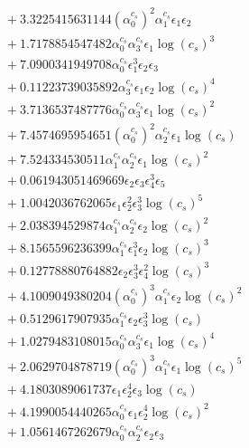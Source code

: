 \documentclass[10pt]{article}
\begin{document}
\begin{align*}
&{}  + 3.3225415631144 \left(\alpha_{0}^{c_s}\right)^{2} \alpha_{1}^{c_s} \epsilon_{1} \epsilon_{2} \\
&{}  + 1.7178854547482 \alpha_{0}^{c_s} \alpha_{3}^{c_s} \epsilon_{1} \log{\left(c_{s} \right)}^{3} \\
&{}  + 7.0900341949708 \alpha_{0}^{c_s} \epsilon_{1}^{3} \epsilon_{2} \epsilon_{3} \\
&{}  + 0.11223739035892 \alpha_{3}^{c_s} \epsilon_{1} \epsilon_{2} \log{\left(c_{s} \right)}^{4} \\
&{}  + 3.7136537487776 \alpha_{0}^{c_s} \alpha_{3}^{c_s} \epsilon_{1} \log{\left(c_{s} \right)}^{2} \\
&{}  + 7.4574695954651 \left(\alpha_{0}^{c_s}\right)^{2} \alpha_{2}^{c_s} \epsilon_{1} \log{\left(c_{s} \right)} \\
&{}  + 7.524334530511 \alpha_{1}^{c_s} \alpha_{2}^{c_s} \epsilon_{1} \log{\left(c_{s} \right)}^{2} \\
&{}  + 0.061943051469669 \epsilon_{2} \epsilon_{3} \epsilon_{4}^{3} \epsilon_{5} \\
&{}  + 1.0042036762065 \epsilon_{1} \epsilon_{2}^{2} \epsilon_{3}^{3} \log{\left(c_{s} \right)}^{5} \\
&{}  + 2.038394529874 \alpha_{1}^{c_s} \alpha_{2}^{c_s} \epsilon_{2} \log{\left(c_{s} \right)}^{2} \\
&{}  + 8.1565596236399 \alpha_{1}^{c_s} \epsilon_{1}^{3} \epsilon_{2} \log{\left(c_{s} \right)}^{3} \\
&{}  + 0.12778880764882 \epsilon_{2} \epsilon_{3}^{3} \epsilon_{4}^{2} \log{\left(c_{s} \right)}^{3} \\
&{}  + 4.1009049380204 \left(\alpha_{0}^{c_s}\right)^{3} \alpha_{1}^{c_s} \epsilon_{2} \log{\left(c_{s} \right)}^{2} \\
&{}  + 0.5129617907935 \alpha_{1}^{c_s} \epsilon_{2} \epsilon_{3}^{3} \log{\left(c_{s} \right)} \\
&{}  + 1.0279483108015 \alpha_{0}^{c_s} \alpha_{3}^{c_s} \epsilon_{1} \log{\left(c_{s} \right)}^{4} \\
&{}  + 2.0629704878719 \left(\alpha_{0}^{c_s}\right)^{3} \alpha_{1}^{c_s} \epsilon_{1} \log{\left(c_{s} \right)}^{5} \\
&{}  + 4.1803089061737 \epsilon_{1} \epsilon_{2}^{4} \epsilon_{3} \log{\left(c_{s} \right)} \\
&{}  + 4.1990054440265 \alpha_{0}^{c_s} \epsilon_{1} \epsilon_{2}^{4} \log{\left(c_{s} \right)}^{2} \\
&{}  + 1.0561467262679 \alpha_{0}^{c_s} \alpha_{2}^{c_s} \epsilon_{2} \epsilon_{3} \\

\end{align*}
\end{document}
